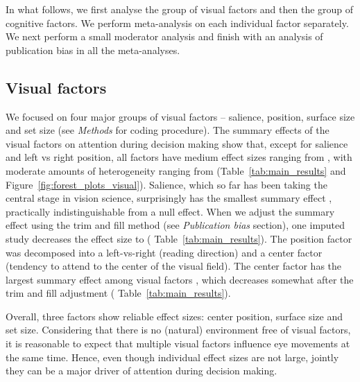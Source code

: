 \documentclass[english,natbib,man,floatsintext]{apa6}
\begin{document}
In what follows, we first analyse the group of visual factors and then the group of cognitive factors. We perform meta-analysis on each individual factor  separately. We next perform a small moderator analysis and finish with an analysis of publication bias in all the meta-analyses.  


\subsection{Visual factors}

We focused on four major groups of visual factors -- salience, position, surface size and set size (see \textit{Methods} for coding procedure). The summary effects of the visual factors on attention during decision making show that, except for salience and left vs right position, all factors have medium effect sizes ranging from , with moderate amounts of heterogeneity ranging from  (Table~\ref{tab:main_results} and Figure~\ref{fig:forest_plots_visual}). 
Salience, which so far has been taking the central stage in vision science, surprisingly has the smallest summary effect , practically indistinguishable from a null effect. When we adjust the summary effect using the trim and fill method (see \textit{Publication bias} section), one imputed study decreases the effect size to ( Table~\ref{tab:main_results}). 
The position factor was decomposed into a left-vs-right (reading direction) and a center factor (tendency to attend to the center of the visual field). The center factor has the largest summary effect among visual factors , which decreases somewhat after the trim and fill adjustment ( Table~\ref{tab:main_results}). 

Overall, three factors show reliable effect sizes: center position, surface size and set size. Considering that there is no (natural) environment free of visual factors, it is reasonable to expect that multiple visual factors influence eye movements at the same time. Hence, even though individual effect sizes are not large, jointly they can be a major driver of attention during decision making.



\end{document}
